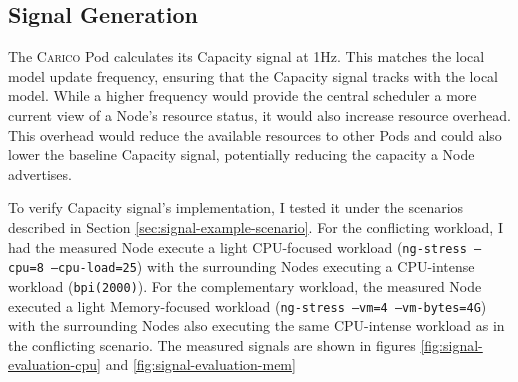 \subsection{Signal Generation}
The \textsc{Carico} Pod calculates its Capacity signal at 1Hz. This matches the local
model update frequency, ensuring that the Capacity signal tracks with the local
model. While a higher frequency would provide the central scheduler a more
current view of a Node's resource status, it would also increase resource
overhead. This overhead would reduce the available resources to other
Pods and could also lower the baseline Capacity signal, potentially reducing
the capacity a Node advertises.

To verify Capacity signal's implementation, I tested it under the scenarios
described in Section \ref{sec:signal-example-scenario}. For the conflicting
workload, I had the measured Node execute a light CPU-focused workload
(\texttt{ng-stress --cpu=8 --cpu-load=25}) with the surrounding Nodes executing
a CPU-intense workload (\texttt{bpi(2000)}). For the complementary workload, the
measured Node executed a light Memory-focused workload (\texttt{ng-stress --vm=4
--vm-bytes=4G}) with the surrounding Nodes also executing the same CPU-intense
workload as in the conflicting scenario. The measured signals are shown in
figures \ref{fig:signal-evaluation-cpu} and \ref{fig:signal-evaluation-mem}

